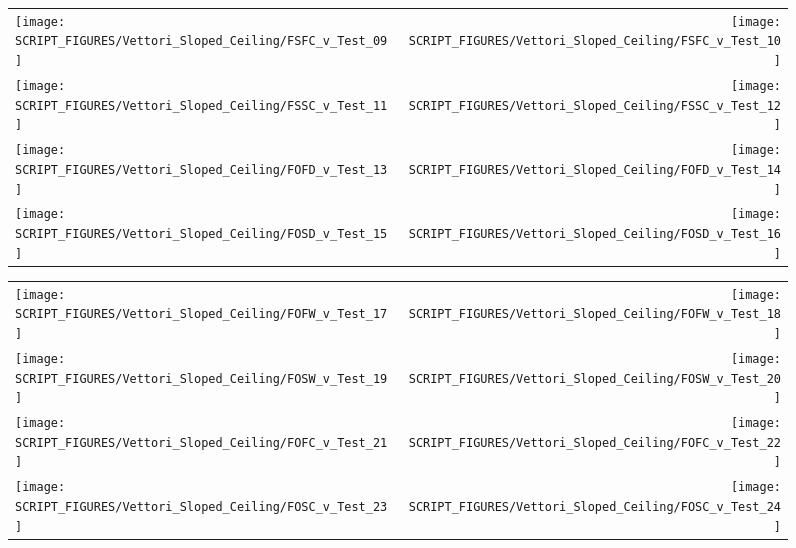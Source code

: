 \begin{figure}[p]
\begin{tabular*}{\textwidth}{l@{\extracolsep{\fill}}r}
\texttt{[image: SCRIPT\_FIGURES/Vettori\_Sloped\_Ceiling/FSFC\_v\_Test\_09]} &
\texttt{[image: SCRIPT\_FIGURES/Vettori\_Sloped\_Ceiling/FSFC\_v\_Test\_10]} \\
\texttt{[image: SCRIPT\_FIGURES/Vettori\_Sloped\_Ceiling/FSSC\_v\_Test\_11]} &
\texttt{[image: SCRIPT\_FIGURES/Vettori\_Sloped\_Ceiling/FSSC\_v\_Test\_12]} \\
\texttt{[image: SCRIPT\_FIGURES/Vettori\_Sloped\_Ceiling/FOFD\_v\_Test\_13]} &
\texttt{[image: SCRIPT\_FIGURES/Vettori\_Sloped\_Ceiling/FOFD\_v\_Test\_14]} \\
\texttt{[image: SCRIPT\_FIGURES/Vettori\_Sloped\_Ceiling/FOSD\_v\_Test\_15]} &
\texttt{[image: SCRIPT\_FIGURES/Vettori\_Sloped\_Ceiling/FOSD\_v\_Test\_16]} \\
\end{tabular*}
\label{Vettori_Sloped_2}
\end{figure}

\begin{figure}[p]
\begin{tabular*}{\textwidth}{l@{\extracolsep{\fill}}r}
\texttt{[image: SCRIPT\_FIGURES/Vettori\_Sloped\_Ceiling/FOFW\_v\_Test\_17]} &
\texttt{[image: SCRIPT\_FIGURES/Vettori\_Sloped\_Ceiling/FOFW\_v\_Test\_18]} \\
\texttt{[image: SCRIPT\_FIGURES/Vettori\_Sloped\_Ceiling/FOSW\_v\_Test\_19]} &
\texttt{[image: SCRIPT\_FIGURES/Vettori\_Sloped\_Ceiling/FOSW\_v\_Test\_20]} \\
\texttt{[image: SCRIPT\_FIGURES/Vettori\_Sloped\_Ceiling/FOFC\_v\_Test\_21]} &
\texttt{[image: SCRIPT\_FIGURES/Vettori\_Sloped\_Ceiling/FOFC\_v\_Test\_22]} \\
\texttt{[image: SCRIPT\_FIGURES/Vettori\_Sloped\_Ceiling/FOSC\_v\_Test\_23]} &
\texttt{[image: SCRIPT\_FIGURES/Vettori\_Sloped\_Ceiling/FOSC\_v\_Test\_24]} \\
\end{tabular*}
\label{Vettori_Sloped_3}
\end{figure}


